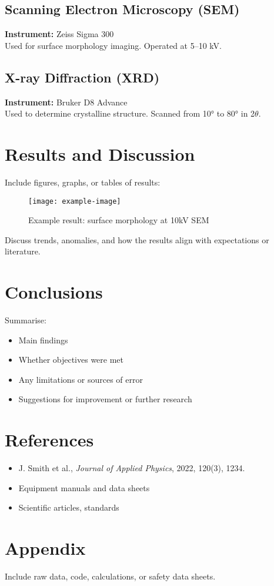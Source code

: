 \documentclass[12pt,a4paper]{article}
\begin{document}
\subsection*{Scanning Electron Microscopy (SEM)}
\textbf{Instrument:} Zeiss Sigma 300 \\
Used for surface morphology imaging. Operated at 5–10 kV.

\subsection*{X-ray Diffraction (XRD)}
\textbf{Instrument:} Bruker D8 Advance \\
Used to determine crystalline structure. Scanned from 10° to 80° in 2$\theta$.

\section{Results and Discussion}
Include figures, graphs, or tables of results:
\begin{figure}[H]
    \centering
    \texttt{[image: example-image]}
    \caption{Example result: surface morphology at 10kV SEM}
\end{figure}

Discuss trends, anomalies, and how the results align with expectations or literature.

\section{Conclusions}
Summarise:
\begin{itemize}
    \item Main findings
    \item Whether objectives were met
    \item Any limitations or sources of error
    \item Suggestions for improvement or further research
\end{itemize}

\section*{References}
\begin{itemize}
    \item J. Smith et al., \textit{Journal of Applied Physics}, 2022, 120(3), 1234.
    \item Equipment manuals and data sheets
    \item Scientific articles, standards
\end{itemize}

\appendix
\section*{Appendix}
Include raw data, code, calculations, or safety data sheets.
\end{document}
